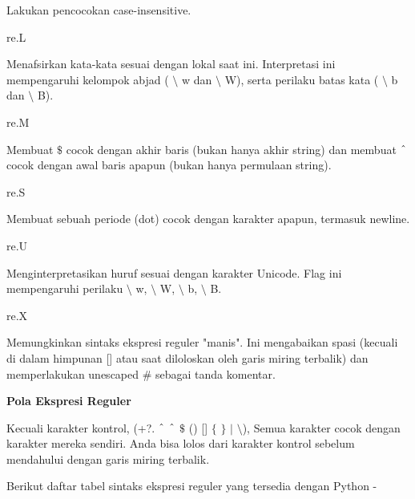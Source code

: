 \begin {enumerate}
\begin {enumerate}
\noindent
Lakukan pencocokan case-insensitive. \par
\vspace{12pt}
\noindent
re.L \hspace*{0.5in}  \par
\noindent
Menafsirkan kata-kata sesuai dengan lokal saat ini. Interpretasi ini mempengaruhi kelompok abjad ( $  \setminus  $ w dan  $  \setminus  $ W), serta perilaku batas kata ( $  \setminus  $ b dan  $  \setminus  $ B). \par
\vspace{12pt}
\noindent
re.M \hspace*{0.5in}  \par
\noindent
Membuat  $  \$  $ cocok dengan akhir baris (bukan hanya akhir string) dan membuat  $  \string^  $ cocok dengan awal baris apapun (bukan hanya permulaan string). \par
\vspace{12pt}
\noindent
re.S \hspace*{0.5in}  \par
\noindent
Membuat sebuah periode (dot) cocok dengan karakter apapun, termasuk newline. \par
\noindent
re.U \hspace*{0.5in}  \par
\noindent
Menginterpretasikan huruf sesuai dengan karakter Unicode. Flag ini mempengaruhi perilaku  $  \setminus  $ w,  $  \setminus  $ W,  $  \setminus  $ b,  $  \setminus  $ B. \par
\vspace{12pt}
\noindent
re.X \hspace*{0.5in}  \par
\noindent
Memungkinkan sintaks ekspresi reguler "manis". Ini mengabaikan spasi (kecuali di dalam himpunan [] atau saat diloloskan oleh garis miring terbalik) dan memperlakukan unescaped  $  \#  $ sebagai tanda komentar. \par
\vspace{12pt}
\noindent
\textbf{Pola Ekspresi Reguler} \par
\vspace{12pt}
\noindent
Kecuali karakter kontrol, (+?.  $  \string^  $  $  \string^  $  $  \$  $ () []  $  \{  $ $  \}  $  $  \vert  $  $  \setminus  $), Semua karakter cocok dengan karakter mereka sendiri. Anda bisa lolos dari karakter kontrol sebelum mendahului dengan garis miring terbalik. \par
\noindent
Berikut daftar tabel sintaks ekspresi reguler yang tersedia dengan Python - \par

\end{enumerate}
\end{enumerate}
